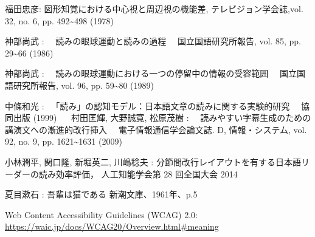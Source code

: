 
\begin{bib}[100]

\begin{thebibliography}{}

  福田忠彦: 
    \newblock 図形知覚における中心視と周辺視の機能差, 
    \newblock テレビジョン学会誌,vol. 32, no. 6, pp. 492\textasciitilde498 (1978)

    神部尚武 :
     　\newblock 読みの眼球運動と読みの過程
     　\newblock 国立国語研究所報告, vol. 85, pp. 29\textasciitilde66 (1986)

  神部尚武 :
   　\newblock 読みの眼球運動における一つの停留中の情報の受容範囲
   　\newblock 国立国語研究所報告, vol. 96, pp. 59\textasciitilde80 (1989)

  中條和光 :
 　\newblock 「読み」の認知モデル：日本語文章の読みに関する実験的研究
 　\newblock 協同出版 (1999)
  　
  村田匡輝, 大野誠寛, 松原茂樹 :
  　\newblock 読みやすい字幕生成のための講演文への漸進的改行挿入
  　\newblock 電子情報通信学会論文誌. D, 情報・システム, vol. 92, no. 9, pp. 1621\textasciitilde1631 (2009)

  小林潤平, 関口隆, 新堀英二, 川嶋稔夫 :
    \newblock 分節間改行レイアウトを有する日本語リーダーの読み効率評価，
    \newblock 人工知能学会第 28 回全国大会 2014

  夏目漱石 :
  \newblock 吾輩は猫である
  \newblock 新潮文庫、1961年、p.5

  Web Content Accessibility Guidelines (WCAG) 2.0:
  \newblock \protect\url{https://waic.jp/docs/WCAG20/Overview.html#meaning}

\end{thebibliography}

\end{bib}
